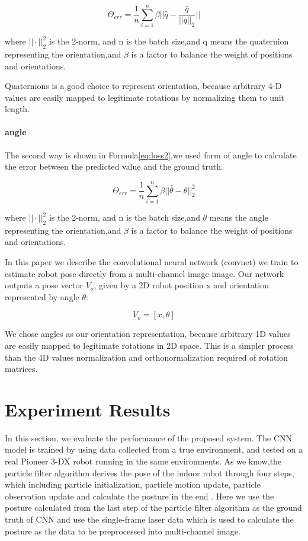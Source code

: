 \documentclass[journal]{IEEEtran}
\begin{document}
\begin{equation}
	 \Theta_{err}= \frac{1}{n}\sum_{i=1}^{n}\beta||\hat{q}-\frac{\hat{q}}{||q||_2}||   \label{eq:loss1}
\end{equation}

where $|| \cdot ||^2_2 $ is the 2-norm,  and n is the batch size,and q means the quaternion representing the orientation,and $\beta$  is a factor to balance the weight of positions and orientations.

Quaternions is a good choice to represent orientation, because arbitrary 4-D values are easily mapped to legitimate rotations by normalizing them to unit length.

\paragraph{angle}
The second way is shown in Formula\ref{eq:loss2},we used form of angle to calculate the error between the predicted value and the ground truth.

\begin{equation}
\Theta_{err}= \frac{1}{n}\sum_{i=1}^{n}\beta||\hat{\theta} -\theta ||^2_2 \label{eq:loss2}
\end{equation}

where $|| \cdot ||^2_2 $ is the 2-norm,  and n is the batch size,and $\theta$ means the angle representing the orientation,and $\beta$  is a factor to balance the weight of positions and orientations.

In this paper we describe the convolutional neural network (convnet) we train to estimate robot pose directly from a multi-channel image  image. Our network outputs a pose vector $V_o$, given by a 2D robot position x and orientation
represented by angle $\theta$:

\begin{equation}
	V_o=[x,\theta]  \label{eq:out}
\end{equation}

We chose angles as our orientation representation, because arbitrary 1D values are easily mapped to legitimate rotations in 2D space. This is a simpler process than the 4D values  normalization and orthonormalization required of rotation matrices.

\section{Experiment Results}
In this section, we evaluate the performance of the proposed system. The CNN model is trained by using data collected from a true environment, and tested on a real Pioneer 3-DX robot running in the same environments. As we know,the particle filter algorithm derives the pose of the indoor robot through four steps, which including particle initialization, particle motion update, particle observation update and calculate the posture in the end \cite{thrun2005probabilistic}. Here we use the posture calculated from the last step of the particle filter algorithm as the ground truth of CNN and use the single-frame laser data which is used to calculate the posture as the data to be preprocessed into multi-channel image.
\end{document}
